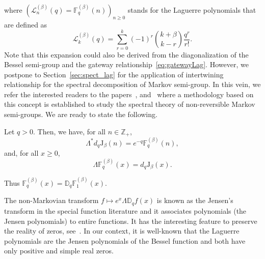 \documentclass[AHL,Unicode,longabstracts]{cedram}
\newcommand{\ZZ}{\mathbb{Z}}
\newcommand{\Jg}{{\mathrm{J}}_{\beta}}
\newcommand{\discret}[1]{\mathds{#1}}
\newcommand{\cont}[1]{{#1}}
\newcommand{\adjL}{\Lambda^*}
\begin{document}
where $(\mathcal{L}^{(\beta)}_n(q)={\mathbb{F}}^{(\beta)}_q(n))_{n\geq 0}$ stands for the Laguerre polynomials that are defined as
\begin{equation*}
\mathcal{L}^{(\beta)}_k(q)=\sum_{r=0}^k (-1)^r \binom{ k +\beta}{k-r} \frac{q^r }{r!}.
\end{equation*}
Note that this expansion could also be derived from the diagonalization of the Bessel semi-group and the gateway relationship~\eqref{eq:gatewayLag}. However, we postpone to Section~\ref{sec:spect_lag} for the application of intertwining relationship for the spectral decomposition of Markov semi-group. In this vein, we refer the interested readers to the papers~\cite{Patie-Savov-16}, \cite{Choi_similarity} and~\cite{Choi_skip} where a methodology based on this concept is established to study the spectral theory of non-reversible Markov semi-groups. We are ready to state the following.

\begin{prop}
Let $q>0$. Then, we have, for all $n \in \ZZ_+$,
\begin{equation}\label{eq:LJL}
\adjL \cont{d}_q \Jg(n)= e^{-q}{\mathbb{F}}^{(\beta)}_q(n),
\end{equation}
and, for all $x\geq 0$,
\begin{equation}\label{eq:Jensen}
\Lambda \mathbb{F}^{(\beta)}_q(x)=\cont{d}_q\Jg(x).
\end{equation}
\end{prop}

Thus $\mathbb{F}^{(\beta)}_q(x)=\discret{D}_q \mathbb{F}^{(\beta)}_1(x)$.

\begin{rema}
The non-Markovian transform $f\mapsto e^{x}\Lambda \discret{D}_qf(x)$ is known as the Jensen's transform in the special function literature and it associates polynomials (the Jensen polynomials) to entire functions. It has the interesting feature to preserve the reality of zeros, see~\cite{Jensen}. In our context, it is well-known that the Laguerre polynomials are the Jensen polynomials of the Bessel function and both have only positive and simple real zeros.
\end{rema}
\end{document}
